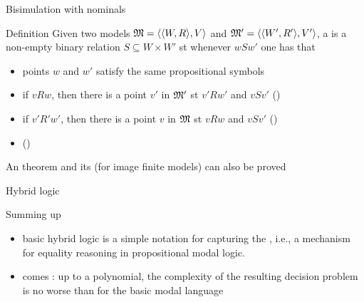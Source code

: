 \documentclass{beamer}
\begin{document}
\begin{slide}{Bisimulation with nominals}\label{s:50}
\small
\begin{block}{Definition}
Given two models $\mathfrak{M} = \mathopen{\langle}\mathopen{\langle}W, R\mathclose{\rangle}, V\mathclose{\rangle}$ and $\mathfrak{M}' = \mathopen{\langle}\mathopen{\langle}W', R'\mathclose{\rangle}, V'\mathclose{\rangle}$, a  is a non-empty binary relation
$S \subseteq W \times W'$  st whenever $w S w'$ one has that
\begin{itemize}
\item points $w$ and $w'$ satisfy the same propositional symbols 
\item if $v R w$, then there is a point $v'$ in $\mathfrak{M}'$ st  $v' R w'$ and $v S v'$ \hspace{0.3cm} ()
\item if $v' R' w'$, then there is a point $v$ in $\mathfrak{M}$ st  $v R w$ and $v S v'$ \hspace{0.3cm} ()
\item {} ()
\end{itemize}
\end{block}

An  theorem and its  (for image finite models) can also be proved

\end{slide}

\begin{slide}{Hybrid logic}\label{s:51a}
\small

\begin{block}{Summing up}
\begin{itemize}
\item basic hybrid logic is a simple notation for capturing  the , i.e., a mechanism for equality reasoning in propositional modal logic. 
\item comes : up to a polynomial, the complexity of the resulting decision problem is no worse than for the basic modal language
\end{itemize}
\end{block}
\end{slide}
\end{document}
